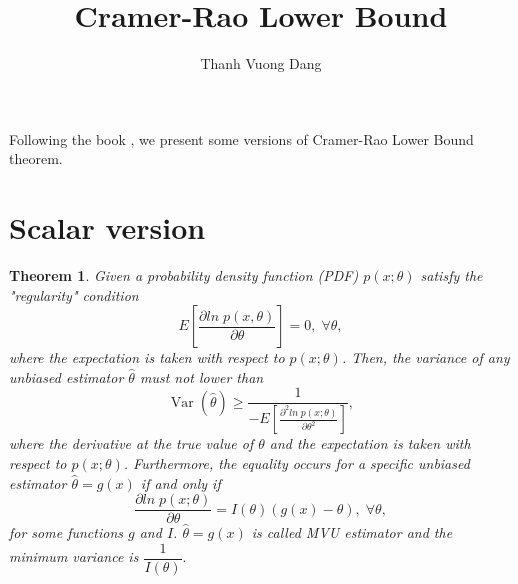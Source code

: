 \documentclass{article}
\title{Cramer-Rao Lower Bound}
\author{Thanh Vuong Dang}
\newtheorem{theorem}{Theorem}
\begin{document}
\maketitle
Following the book \cite{Kay}, we present some versions of Cramer-Rao Lower Bound theorem.
\section{Scalar version}
\begin{theorem}
Given a probability density function (PDF) $p(x;\theta)$ satisfy the "regularity" condition
\begin{equation}\label{1}
E\left[\dfrac{\partial ln \; p(x,\theta)}{\partial \theta}\right] = 0, \; \forall \theta,
\end{equation}
where the expectation is taken with respect to $p(x;\theta)$. Then, the variance of any unbiased estimator $\widehat{\theta}$ must not lower than 
\begin{equation}\label{2}
    \operatorname{Var}(\widehat{\theta}) \geq \dfrac{1}{-E\left[\frac{\partial^{2}ln\; p(x; \theta)}{\partial \theta^{2}}\right]},
\end{equation}
where the derivative at the true value of $\theta$ and the expectation is taken with respect to $p(x;\theta)$. Furthermore, the equality occurs for a specific unbiased estimator $\widehat{\theta} = g(x)$ if and only if
\begin{equation}\label{3}
\dfrac{\partial ln\;p(x;\theta)}{\partial \theta} = I(\theta)(g(x) - \theta), \; \forall \theta,
\end{equation}
for some functions $g$ and $I$. $\widehat{\theta} =  g(x)$ is called MVU estimator and the minimum variance is $\dfrac{1}{I(\theta)}.$
\end{theorem}
\end{document}
